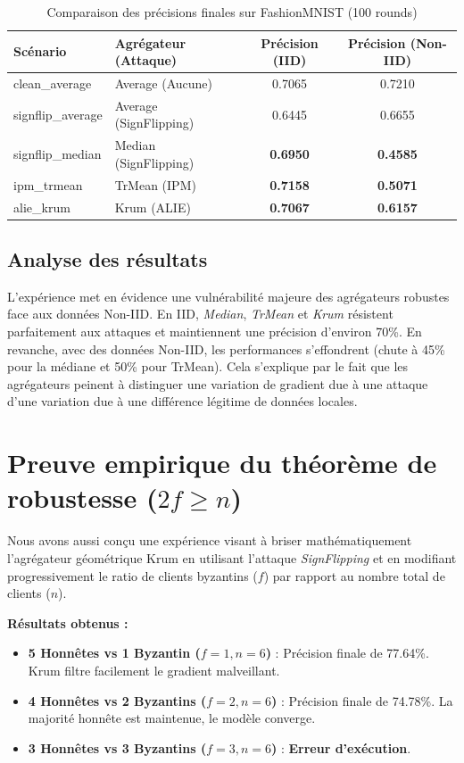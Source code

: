 \documentclass[11pt, a4paper]{article}
\begin{document}
\begin{table}[h]
\centering
\begin{tabular}{@{}llcc@{}}
\toprule
\textbf{Scénario} & \textbf{Agrégateur (Attaque)} & \textbf{Précision (IID)} & \textbf{Précision (Non-IID)} \\ \midrule
clean\_average     & Average (Aucune)              & 0.7065 & 0.7210 \\
signflip\_average  & Average (SignFlipping)        & 0.6445 & 0.6655 \\
signflip\_median   & Median (SignFlipping)         & \textbf{0.6950} & \textbf{0.4585} \\
ipm\_trmean        & TrMean (IPM)                  & \textbf{0.7158} & \textbf{0.5071} \\
alie\_krum         & Krum (ALIE)                   & \textbf{0.7067} & \textbf{0.6157} \\ \bottomrule
\end{tabular}
\caption{Comparaison des précisions finales sur FashionMNIST (100 rounds)}
\end{table}

\subsection{Analyse des résultats}
L'expérience met en évidence une vulnérabilité majeure des agrégateurs robustes face aux données Non-IID. En IID, \textit{Median}, \textit{TrMean} et \textit{Krum} résistent parfaitement aux attaques et maintiennent une précision d'environ 70\%. En revanche, avec des données Non-IID, les performances s'effondrent (chute à 45\% pour la médiane et 50\% pour TrMean). Cela s'explique par le fait que les agrégateurs peinent à distinguer une variation de gradient due à une attaque d'une variation due à une différence légitime de données locales.


\section{Preuve empirique du théorème de robustesse ($2f \ge n$)}
Nous avons aussi conçu une expérience visant à briser mathématiquement l'agrégateur géométrique Krum en utilisant l'attaque \textit{SignFlipping} et en modifiant progressivement le ratio de clients byzantins ($f$) par rapport au nombre total de clients ($n$).

\textbf{Résultats obtenus :}
\begin{itemize}
    \item \textbf{5 Honnêtes vs 1 Byzantin ($f=1, n=6$)} : Précision finale de 77.64\%. Krum filtre facilement le gradient malveillant.
    \item \textbf{4 Honnêtes vs 2 Byzantins ($f=2, n=6$)} : Précision finale de 74.78\%. La majorité honnête est maintenue, le modèle converge.
    \item \textbf{3 Honnêtes vs 3 Byzantins ($f=3, n=6$)} : \textbf{Erreur d'exécution}.
\end{itemize}
\end{document}
